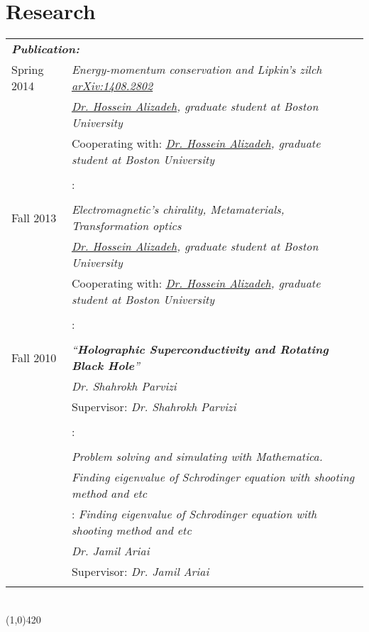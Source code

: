 \documentclass[10pt]{article}
\newcommand\HRule{\hspace*{.8cm}\line(1,0){420}\\}
\newenvironment{Record}[1]
{
    \vspace{-0.35cm}
    \section*{#1}
        \vspace{-0.1cm}
        \begin{tabular}
}
{
        \end{tabular}\\
        \HRule
}
\begin{document}
\newcommand{\Research}[7]{
    \multicolumn{2}{l}{\textbf{\textsl{ #1:}}}\\
    \quad#2&\textit{#3}\\
    \ifthenelse{\isempty{#4}}
    {&\textit{#5}\\}
    {&#4: \textit{#5}\\}
    \ifthenelse{\isempty{#6}}
    {&\textit{#7}\\}
    {&#6: \textit{#7}\\}%
}

\begin{Record}{Research}{l l}
    \Research{Publication}
        {Spring 2014}
        {Energy-momentum conservation and Lipkin’s zilch \href{http://arxiv.org/abs/1408.2802}{arXiv:1408.2802}}
        {Cooperating with}
        {\href{http://physics.bu.edu/people/show/halizade}{Dr. Hossein Alizadeh}, graduate student at Boston University}
        {}{}%
    \Research{Independent Research}
        {Fall 2013}
        {Electromagnetic's chirality, Metamaterials, Transformation optics}
        {Cooperating with}
        {\href{http://physics.bu.edu/people/show/halizade}{Dr. Hossein Alizadeh}, graduate student at Boston University}
        {}{}%
    \Research{M.Sc thesis}
        {Fall 2010}
        {``\textbf{Holographic Superconductivity and Rotating Black Hole}''}
        {Supervisor}
        {Dr. Shahrokh Parvizi}
        {}{}%
    \Research{B.Sc projects}
        {}
        {Problem solving and simulating with Mathematica.}
        {}
        {Finding eigenvalue of Schrodinger equation with shooting method and etc}
        {Supervisor}
        {Dr. Jamil Ariai}%

\end{Record}


\newcommand{\WorkExperience}[7]{
    \multicolumn{3}{l}{\textbf{\textsl{ #1}}}\\
    \quad#2&%
        \ifthenelse{\equal{#3}{Teacher}}
            {%
                \textit{Responsibility:} #3\\
                &\textit{Courses Taught:} #4}
            {}%
        \ifthenelse{\equal{#3}{Open Source}}
            {%
                #3\\
                &\textit{Implemented by:} #4. \textit{Source:} #5\\
                &\textit{Implemented by:} #6. \textit{Source:} #7}
            {}%
        \ifthenelse{\equal{#3}{Programmer}}
            {%
                \textit{Responsibility:} #3\\
                &\textit{Languages:} \texttt{#4}\\
                &\textit{Project:} #5\\
                &\textit{Project:} #6
            }
            {}%
            \\
}
\end{document}
